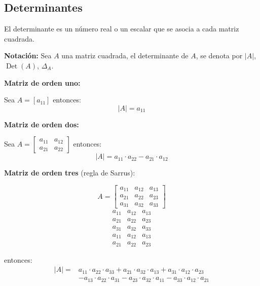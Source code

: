 \documentclass[11pt,a4paper]{article}
\begin{document}
\subsection*{Determinantes}
El determinante es un número real o un escalar que se asocia a cada matriz cuadrada.

\textbf{Notación:} Sea $A$ una matriz cuadrada, el determinante de $A$, se denota por $|A|$,
$\operatorname{Det}(A)$, $\Delta_A$.

\begin{minipage}[t]{0.339\textwidth}
\textbf{Matriz de orden uno:}

Sea $A = [a_{11}]$ entonces:
\[|A| = a_{11}\]
\end{minipage}\hfill
\begin{minipage}[t]{0.630\textwidth}
\textbf{Matriz de orden dos:}

Sea $A = \begin{bmatrix} a_{11} & a_{12}\\ a_{21} & a_{22}\end{bmatrix}$ entonces:
\[|A| = a_{11}\cdot a_{22} - a_{21}\cdot a_{12}\]
\end{minipage}

\medskip
\textbf{Matriz de orden tres} (regla de Sarrus):

\begin{minipage}{0.339\textwidth}
\[
A = \begin{bmatrix}
a_{11} & a_{12} & a_{13}\\
a_{21} & a_{22} & a_{23}\\
a_{31} & a_{32} & a_{33}
\end{bmatrix}
\]
\[
\begin{array}{ccc}
a_{11} & a_{12} & a_{13}\\
a_{21} & a_{22} & a_{23}\\
a_{31} & a_{32} & a_{33}\\ \hline
a_{11} & a_{12} & a_{13}\\
a_{21} & a_{22} & a_{23}
\end{array}
\]
\end{minipage}\hfill
\begin{minipage}{0.630\textwidth}
entonces:
\begin{align*}
|A| = {}& a_{11}\cdot a_{22}\cdot a_{33} + a_{21}\cdot a_{32}\cdot a_{13} + a_{31}\cdot a_{12}\cdot a_{23}\\
& - a_{13}\cdot a_{22}\cdot a_{31} - a_{23}\cdot a_{32}\cdot a_{11} - a_{33}\cdot a_{12}\cdot a_{21}
\end{align*}
\end{minipage}
\end{document}
